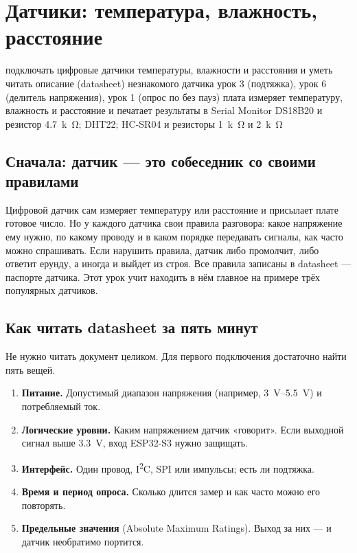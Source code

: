 \section{Датчики: температура, влажность, расстояние}
\lessonintro
  {подключать цифровые датчики температуры, влажности и расстояния и уметь читать описание (datasheet) незнакомого датчика}
  {урок 3 (подтяжка), урок 6 (делитель напряжения), урок 1 (опрос по  без пауз)}
  {плата измеряет температуру, влажность и расстояние и печатает результаты в Serial Monitor}
  {DS18B20 и резистор \SI{4.7}{k\ohm}; DHT22; HC-SR04 и резисторы \SI{1}{k\ohm} и \SI{2}{k\ohm}}

\subsection{Сначала: датчик --- это собеседник со своими правилами}

Цифровой датчик сам измеряет температуру или расстояние и присылает плате готовое число. Но у каждого
датчика свои правила разговора: какое напряжение ему нужно, по какому проводу и в каком порядке
передавать сигналы, как часто можно спрашивать. Если нарушить правила, датчик либо промолчит, либо
ответит ерунду, а иногда и выйдет из строя. Все правила записаны в datasheet --- паспорте датчика. Этот
урок учит находить в нём главное на примере трёх популярных датчиков.

\subsection{Как читать datasheet за пять минут}

Не нужно читать документ целиком. Для первого подключения достаточно найти пять вещей.

\begin{enumerate}
  \item \textbf{Питание.} Допустимый диапазон напряжения (например, \SIrange{3}{5.5}{V}) и потребляемый ток.
  \item \textbf{Логические уровни.} Каким напряжением датчик «говорит». Если выходной сигнал выше \SI{3.3}{V},
        вход ESP32-S3 нужно защищать.
  \item \textbf{Интерфейс.} Один провод, I\textsuperscript{2}C, SPI или импульсы; есть ли подтяжка.
  \item \textbf{Время и период опроса.} Сколько длится замер и как часто можно его повторять.
  \item \textbf{Предельные значения} (Absolute Maximum Ratings). Выход за них --- и датчик необратимо портится.
\end{enumerate}

